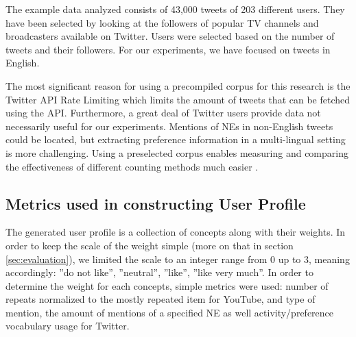 The example data analyzed consists of 43,000 tweets of 203 different users.
They have been selected by looking at the followers of popular TV channels and broadcasters
available on Twitter. Users were selected based on the number of tweets and their followers.
For our experiments, we have focused on tweets in English.

The most significant reason for using a precompiled corpus for this research is the Twitter API
Rate Limiting which limits the amount of tweets that can be fetched using the API.
Furthermore, a great deal of Twitter users provide data not necessarily
useful for our experiments. Mentions of NEs in non-English tweets could be located, but
extracting preference information in a multi-lingual setting is more challenging.
Using a preselected corpus enables measuring and comparing the effectiveness of different
counting methods much easier \cite{short-tweet}.

\subsection{Metrics used in constructing User Profile}

The generated user profile is a collection of concepts along with their
weights. In order to keep the scale of the weight simple (more on that in section
\ref{sec:evaluation}), we limited the scale to an integer range from 0
up to 3, meaning accordingly: ''do not like'', ''neutral'', ''like'', ''like
very much''. In order to determine the weight for each concepts, simple metrics
were used: number of repeats normalized to the mostly repeated item for
YouTube, and type of mention, the amount of mentions of a specified NE as well
activity/preference vocabulary usage for Twitter.

